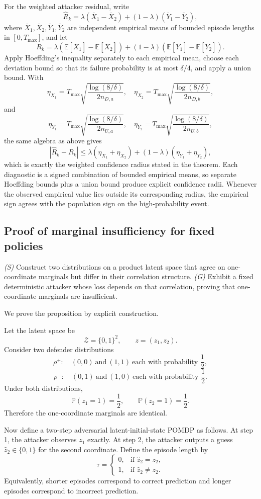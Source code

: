 \documentclass[11pt]{article}
\newcommand{\Zset}{\mathcal{Z}}
\newcommand{\E}{\mathbb{E}}
\newcommand{\Prob}{\mathbb{P}}
\newcommand{\tauT}{\tau}
\begin{document}
For the weighted attacker residual, write
\[
\widehat{R}_k
=
\lambda(\overline{X}_1-\overline{X}_2)+(1-\lambda)(\overline{Y}_1-\overline{Y}_2),
\]
where $\overline{X}_1,\overline{X}_2,\overline{Y}_1,\overline{Y}_2$ are independent empirical means of bounded episode lengths in $[0,T_{\max}]$, and let
\[
R_k
=
\lambda(\E[\overline{X}_1]-\E[\overline{X}_2])+(1-\lambda)(\E[\overline{Y}_1]-\E[\overline{Y}_2]).
\]
Apply Hoeffding's inequality separately to each empirical mean, choose each deviation bound so that its failure probability is at most $\delta/4$, and apply a union bound. With
\[
\eta_{X_1}=T_{\max}\sqrt{\frac{\log(8/\delta)}{2n_{D,a}}},
\quad
\eta_{X_2}=T_{\max}\sqrt{\frac{\log(8/\delta)}{2n_{D,b}}},
\]
and
\[
\eta_{Y_1}=T_{\max}\sqrt{\frac{\log(8/\delta)}{2n_{U,a}}},
\quad
\eta_{Y_2}=T_{\max}\sqrt{\frac{\log(8/\delta)}{2n_{U,b}}},
\]
the same algebra as above gives
\[
|\widehat{R}_k-R_k|
\le
\lambda(\eta_{X_1}+\eta_{X_2})+(1-\lambda)(\eta_{Y_1}+\eta_{Y_2}),
\]
which is exactly the weighted confidence radius stated in the theorem.
Each diagnostic is a signed combination of bounded empirical means, so separate Hoeffding bounds plus a union bound produce explicit confidence radii. Whenever the observed empirical value lies outside its corresponding radius, the empirical sign agrees with the population sign on the high-probability event.

\subsection{Proof of marginal insufficiency for fixed policies}

\noindent\textit{(S)} Construct two distributions on a product latent space that agree on one-coordinate marginals but differ in their correlation structure. \textit{(G)} Exhibit a fixed deterministic attacker whose loss depends on that correlation, proving that one-coordinate marginals are insufficient.

We prove the proposition by explicit construction.

Let the latent space be
\[
\Zset=\{0,1\}^2,
\qquad z=(z_1,z_2).
\]
Consider two defender distributions
\[
\rho^{+}:\quad (0,0)\ \text{and}\ (1,1)\ \text{each with probability } \frac12,
\]
\[
\rho^{-}:\quad (0,1)\ \text{and}\ (1,0)\ \text{each with probability } \frac12.
\]
Under both distributions,
\[
\Prob(z_1=1)=\frac12,
\qquad
\Prob(z_2=1)=\frac12.
\]
Therefore the one-coordinate marginals are identical.

Now define a two-step adversarial latent-initial-state POMDP as follows. At step 1, the attacker observes $z_1$ exactly. At step 2, the attacker outputs a guess $\hat z_2\in\{0,1\}$ for the second coordinate. Define the episode length by
\[
\tauT =
\begin{cases}
0, & \text{if } \hat z_2=z_2,\\
1, & \text{if } \hat z_2\neq z_2.
\end{cases}
\]
Equivalently, shorter episodes correspond to correct prediction and longer episodes correspond to incorrect prediction.
\end{document}
